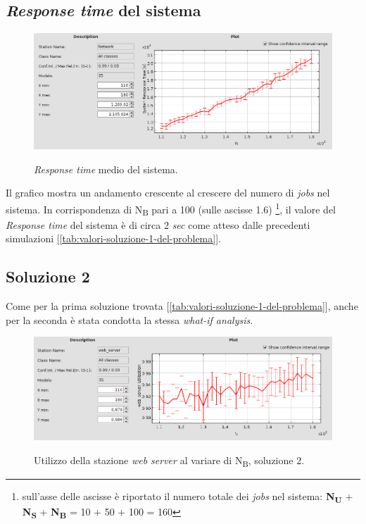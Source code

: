 \documentclass[../main.tex]{subfiles}
\begin{document}
    \subsection{\textit{Response time} del sistema}\label{subsec:response-time-del-sistema}
    \begin{figure}[H]
        \centering
        \includegraphics[scale = 0.5]{assets/response_system.png}\\
        \caption[\textit{Response time} medio del sistema]{\textit{Response time} medio del sistema.}
        \label{fig:response-time-system}
    \end{figure}
    Il grafico mostra un andamento crescente al crescere del numero di \textit{jobs} nel sistema.
    In corrispondenza di N\textsubscript{B} pari a 100 (sulle ascisse 1.6) \footnote{sull'asse delle ascisse è riportato
    il numero totale dei \textit{jobs} nel sistema: \textbf{N\textsubscript{U}} + \textbf{N\textsubscript{S}} +
    \textbf{N\textsubscript{B}} = 10 + 50 + 100 = 160}, il valore del \textit{Response time} del sistema è di circa 2
    \textit{sec} come atteso dalle precedenti simulazioni [\ref{tab:valori-soluzione-1-del-problema}].

    \subsection{Soluzione 2}\label{subsec:soluzione-2}
    Come per la prima soluzione trovata [\ref{tab:valori-soluzione-1-del-problema}], anche per la seconda è stata condotta
    la stessa \textit{what-if analysis}.

    \begin{figure}[H]
        \centering
        \includegraphics[scale = 0.5]{assets/utilization_2_ws.png}\\
        \caption[\textit{Utilizzo} della stazione \textit{web server}, soluzione 2]{Utilizzo della stazione
        \textit{web server} al variare di N\textsubscript{B}, soluzione 2.}
        \label{fig:utilizzo-2-ws}
    \end{figure}
\end{document}
